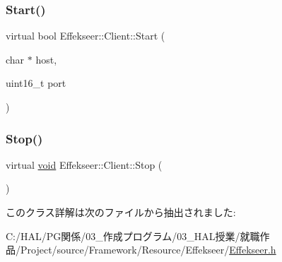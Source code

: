 \subsubsection{\texorpdfstring{Start()}{Start()}}
{\footnotesize\ttfamily virtual bool Effekseer\+::\+Client\+::\+Start (\begin{DoxyParamCaption}\item[{char $\ast$}]{host,  }\item[{uint16\+\_\+t}]{port }\end{DoxyParamCaption})\hspace{0.3cm}{\ttfamily [pure virtual]}}

\mbox{\label{class_effekseer_1_1_client_aa490dfe72eeb567e6eff19d9e8b850c1}} 
\subsubsection{\texorpdfstring{Stop()}{Stop()}}
{\footnotesize\ttfamily virtual \mbox{\hyperlink{namespace_effekseer_ab34c4088e512200cf4c2716f168deb56}{void}} Effekseer\+::\+Client\+::\+Stop (\begin{DoxyParamCaption}{ }\end{DoxyParamCaption})\hspace{0.3cm}{\ttfamily [pure virtual]}}



このクラス詳解は次のファイルから抽出されました\+:\begin{DoxyCompactItemize}
\item 
C\+:/\+H\+A\+L/\+P\+G関係/03\+\_\+作成プログラム/03\+\_\+\+H\+A\+L授業/就職作品/\+Project/source/\+Framework/\+Resource/\+Effekseer/\mbox{\hyperlink{_effekseer_8h}{Effekseer.\+h}}\end{DoxyCompactItemize}
